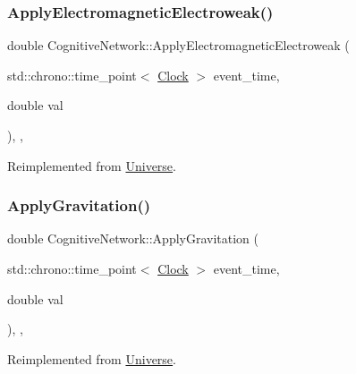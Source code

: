 \subsubsection{\texorpdfstring{Apply\+Electromagnetic\+Electroweak()}{ApplyElectromagneticElectroweak()}}
{\footnotesize\ttfamily double Cognitive\+Network\+::\+Apply\+Electromagnetic\+Electroweak (\begin{DoxyParamCaption}\item[{std\+::chrono\+::time\+\_\+point$<$ \mbox{\hyperlink{universe_8h_a0ef8d951d1ca5ab3cfaf7ab4c7a6fd80}{Clock}} $>$}]{event\+\_\+time,  }\item[{double}]{val }\end{DoxyParamCaption})\hspace{0.3cm}{\ttfamily [inline]}, {\ttfamily [final]}, {\ttfamily [virtual]}}



Reimplemented from \mbox{\hyperlink{classUniverse_a4c36c1ab30db993307f88363dde5e8c5}{Universe}}.

\mbox{\label{classCognitiveNetwork_a7d3252977440a9a5c004f748647ce885}} 
\subsubsection{\texorpdfstring{Apply\+Gravitation()}{ApplyGravitation()}}
{\footnotesize\ttfamily double Cognitive\+Network\+::\+Apply\+Gravitation (\begin{DoxyParamCaption}\item[{std\+::chrono\+::time\+\_\+point$<$ \mbox{\hyperlink{universe_8h_a0ef8d951d1ca5ab3cfaf7ab4c7a6fd80}{Clock}} $>$}]{event\+\_\+time,  }\item[{double}]{val }\end{DoxyParamCaption})\hspace{0.3cm}{\ttfamily [inline]}, {\ttfamily [final]}, {\ttfamily [virtual]}}



Reimplemented from \mbox{\hyperlink{classUniverse_a76c0b5e63c2a7d1988c44db341c3d64c}{Universe}}.

\mbox{\label{classCognitiveNetwork_a7a55750d3c42a277c4ffe04a87ab3b19}} 
